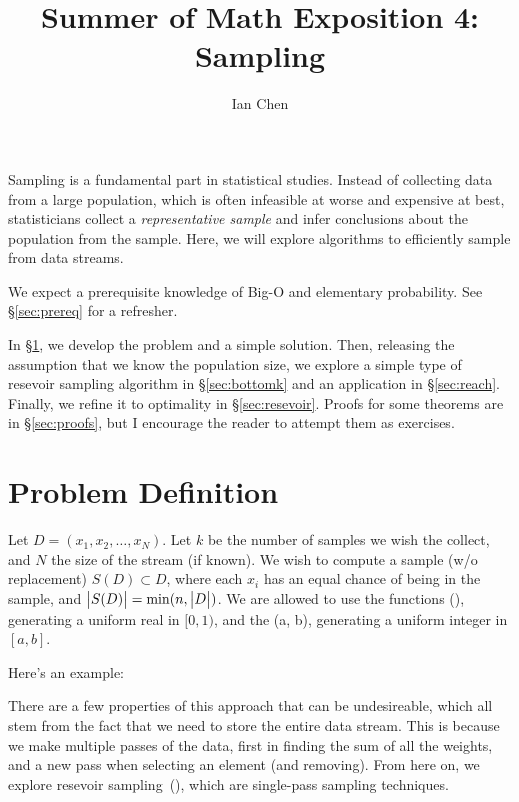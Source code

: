\documentclass{article}
\title{Summer of Math Exposition 4: Sampling}
\author{Ian Chen}
\begin{document}
\maketitle

Sampling is a fundamental part in statistical studies.
Instead of collecting data from a large population, which is often infeasible at worse and expensive at best, statisticians collect a \emph{representative sample} and infer conclusions about the population from the sample.
Here, we will explore algorithms to efficiently sample from data streams.

We expect a prerequisite knowledge of Big-O and elementary probability.
See \S\ref{sec:prereq} for a refresher.

In \S\ref{sec:problem}, we develop the problem and a simple solution.
Then, releasing the assumption that we know the population size, we explore a simple type of resevoir sampling algorithm in \S\ref{sec:bottomk} and an application in \S\ref{sec:reach}.
Finally, we refine it to optimality in \S\ref{sec:resevoir}.
Proofs for some theorems are in \S\ref{sec:proofs}, but I encourage the reader to attempt them as exercises.

\section{Problem Definition}
\label{sec:problem}

Let $D = (x_1, x_2, \ldots, x_N)$.
Let $k$ be the number of samples we wish the collect, and $N$ the size of the stream (if known).
We wish to compute a sample (w/o replacement) $S(D) \subset D$, where each $x_i$ has an equal chance of being in the sample, and $\left| \bigr. S(D) \right| = \min(n, \left| \bigr. D \right|)$.
We are allowed to use the functions \random(), generating a uniform real in $[0, 1)$, and the \randint(a, b), generating a uniform integer in $[a, b]$.

Here's an example:

There are a few properties of this approach that can be undesireable, which all stem from the fact that we need to store the entire data stream.
This is because we make multiple passes of the data, first in finding the sum of all the weights, and a new pass when selecting an element (and removing).
From here on, we explore resevoir sampling~(\cite{vitter85-03}), which are single-pass sampling techniques.
\end{document}
